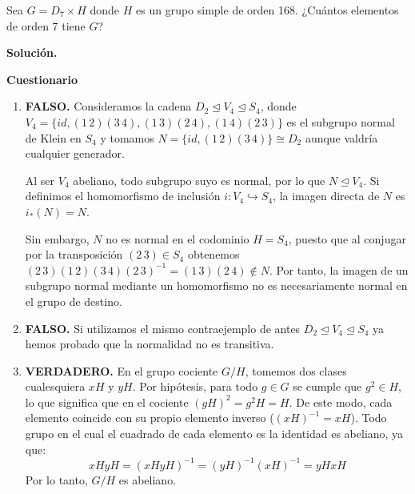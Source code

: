 \documentclass[12pt]{article}
\begin{document}
    \begin{ejercicio}[0.5 puntos]
        Sea $G = D_7 \times H$ donde $H$ es un grupo simple de orden 168. ¿Cuántos elementos de orden 7 tiene $G$?
    \end{ejercicio}

    \newpage
    \setcounter{ejercicio}{0} %
    \noindent
    \textbf{Solución.}

    \begin{ejercicio}[1.0 punto]
        \textbf{Cuestionario}
        \begin{enumerate}[label=\arabic*)]
            \item \textbf{FALSO.} 
            Consideramos la cadena $D_2 \trianglelefteq V_4 \trianglelefteq S_4$, 
            donde\\
            $V_4 = \{id, (1\,2)(3\,4), (1\,3)(2\,4), (1\,4)(2\,3)\}$ es el subgrupo normal de Klein en $S_4$ 
            y tomamos $N = \{id, (1\,2)(3\,4)\} \cong D_2$ aunque valdría cualquier generador.

            Al ser $V_4$ abeliano, todo subgrupo suyo es normal, por lo que $N \trianglelefteq V_4$. 
            Si definimos el homomorfismo de inclusión $i: V_4 \hookrightarrow S_4$, la imagen directa de $N$ es $i_*(N) = N$. 
            
            Sin embargo, $N$ no es normal en el codominio $H = S_4$, puesto que al conjugar por la transposición $(2\,3) \in S_4$ 
            obtenemos $(2\,3)(1\,2)(3\,4)(2\,3)^{-1} = (1\,3)(2\,4) \notin N$. 
            Por tanto, la imagen de un subgrupo normal mediante un homomorfismo no es necesariamente normal en el grupo de destino.
            
            \item \textbf{FALSO.}
            Si utilizamos el mismo contraejemplo de antes $D_2 \trianglelefteq V_4 \trianglelefteq S_4$ ya hemos probado que la normalidad no es transitiva.
            
            \item \textbf{VERDADERO.} 
            En el grupo cociente $G/H$, tomemos dos clases cualesquiera $xH$ y $yH$. 
            Por hipótesis, para todo $g \in G$ se cumple que $g^2 \in H$, lo que significa que en el cociente $(gH)^2 = g^2H = H$. 
            De este modo, cada elemento coincide con su propio elemento inverso ($(xH)^{-1} = xH$). Todo grupo en el cual el cuadrado de cada elemento es la identidad es abeliano, ya que:
            \[ xHyH = (xHyH)^{-1} = (yH)^{-1}(xH)^{-1} = yHxH \]
            Por lo tanto, $G/H$ es abeliano.
            

\end{enumerate}
\end{ejercicio}
\end{document}
